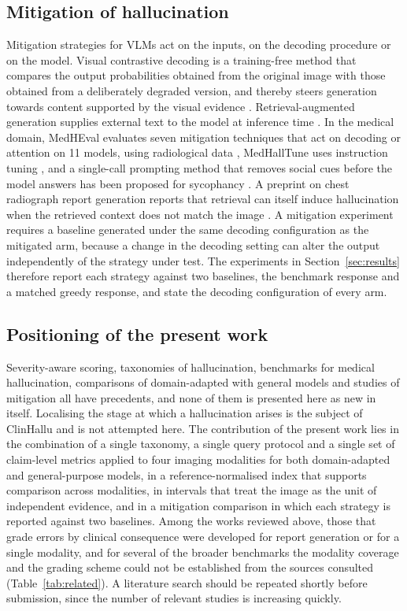 \subsection{Mitigation of hallucination}
\label{subsec:rw_mitigation}

Mitigation strategies for VLMs act on the inputs, on the decoding procedure or on the model. Visual contrastive decoding is a training-free method that compares the output probabilities obtained from the original image with those obtained from a deliberately degraded version, and thereby steers generation towards content supported by the visual evidence \citep{leng2024vcd}. Retrieval-augmented generation supplies external text to the model at inference time \citep{lewis2020rag}. In the medical domain, MedHEval evaluates seven mitigation techniques that act on decoding or attention on 11 models, using radiological data \citep{chang2025medheval}, MedHallTune uses instruction tuning \citep{yan2025medhalltune}, and a single-call prompting method that removes social cues before the model answers has been proposed for sycophancy \citep{xu2025sycophancy}. A preprint on chest radiograph report generation reports that retrieval can itself induce hallucination when the retrieved context does not match the image \citep{idoko2026retrieval}. A mitigation experiment requires a baseline generated under the same decoding configuration as the mitigated arm, because a change in the decoding setting can alter the output independently of the strategy under test. The experiments in Section~\ref{sec:results} therefore report each strategy against two baselines, the benchmark response and a matched greedy response, and state the decoding configuration of every arm.

\subsection{Positioning of the present work}
\label{subsec:rw_position}

Severity-aware scoring, taxonomies of hallucination, benchmarks for medical hallucination, comparisons of domain-adapted with general models and studies of mitigation all have precedents, and none of them is presented here as new in itself. Localising the stage at which a hallucination arises is the subject of ClinHallu \citep{yang2026clinhallu} and is not attempted here. The contribution of the present work lies in the combination of a single taxonomy, a single query protocol and a single set of claim-level metrics applied to four imaging modalities for both domain-adapted and general-purpose models, in a reference-normalised index that supports comparison across modalities, in intervals that treat the image as the unit of independent evidence, and in a mitigation comparison in which each strategy is reported against two baselines. Among the works reviewed above, those that grade errors by clinical consequence were developed for report generation or for a single modality, and for several of the broader benchmarks the modality coverage and the grading scheme could not be established from the sources consulted (Table~\ref{tab:related}). A literature search should be repeated shortly before submission, since the number of relevant studies is increasing quickly.
